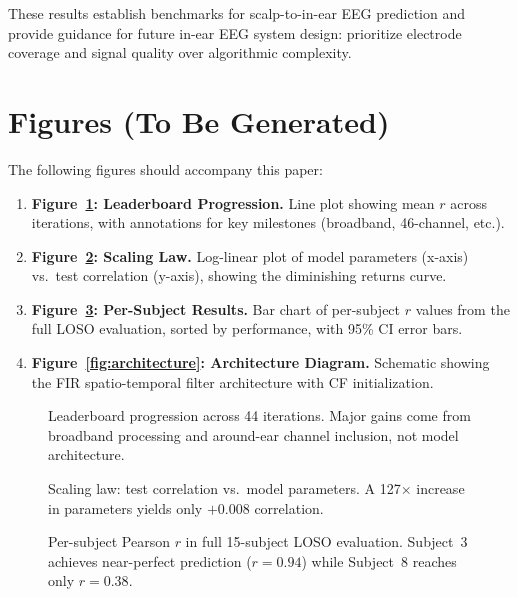 \documentclass[conference]{IEEEtran}
\begin{document}
These results establish benchmarks for scalp-to-in-ear EEG prediction and provide guidance for future in-ear EEG system design: prioritize electrode coverage and signal quality over algorithmic complexity.

\section*{Figures (To Be Generated)}

The following figures should accompany this paper:

\begin{enumerate}
    \item \textbf{Figure~\ref{fig:leaderboard}: Leaderboard Progression.} Line plot showing mean $r$ across iterations, with annotations for key milestones (broadband, 46-channel, etc.).
    \item \textbf{Figure~\ref{fig:scaling_law}: Scaling Law.} Log-linear plot of model parameters (x-axis) vs.\ test correlation (y-axis), showing the diminishing returns curve.
    \item \textbf{Figure~\ref{fig:per_subject}: Per-Subject Results.} Bar chart of per-subject $r$ values from the full LOSO evaluation, sorted by performance, with 95\% CI error bars.
    \item \textbf{Figure~\ref{fig:architecture}: Architecture Diagram.} Schematic showing the FIR spatio-temporal filter architecture with CF initialization.
\end{enumerate}

\begin{figure}[t]
    \centering
    \caption{Leaderboard progression across 44 iterations. Major gains come from broadband processing and around-ear channel inclusion, not model architecture.}
    \label{fig:leaderboard}
\end{figure}

\begin{figure}[t]
    \centering
    \caption{Scaling law: test correlation vs.\ model parameters. A 127$\times$ increase in parameters yields only $+0.008$ correlation.}
    \label{fig:scaling_law}
\end{figure}

\begin{figure}[t]
    \centering
    \caption{Per-subject Pearson $r$ in full 15-subject LOSO evaluation. Subject~3 achieves near-perfect prediction ($r = 0.94$) while Subject~8 reaches only $r = 0.38$.}
    \label{fig:per_subject}
\end{figure}
\end{document}
